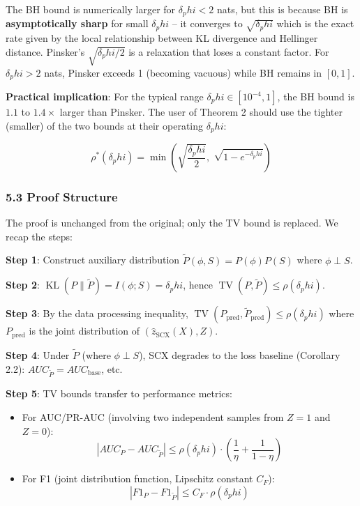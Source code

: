 \documentclass[
  12pt,
]{ctexart}
\providecommand{\tightlist}{%
  \setlength{\itemsep}{0pt}\setlength{\parskip}{0pt}}
\begin{document}
The BH bound is numerically larger for \(\delta_phi < 2\) nats, but this
is because BH is \textbf{asymptotically sharp} for small \(\delta_phi\)
-- it converges to \(\sqrt{\delta_phi}\) which is the exact rate given
by the local relationship between KL divergence and Hellinger distance.
Pinsker's \(\sqrt{\delta_phi/2}\) is a relaxation that loses a constant
factor. For \(\delta_phi > 2\) nats, Pinsker exceeds 1 (becoming
vacuous) while BH remains in \([0,1]\).

\textbf{Practical implication}: For the typical range
\(\delta_phi \in [10^{-4}, 1]\), the BH bound is \(1.1\) to
\(1.4\times\) larger than Pinsker. The user of Theorem 2 should use the
tighter (smaller) of the two bounds at their operating \(\delta_phi\):

\[\rho^*(\delta_phi) = \min\left(\sqrt{\frac{\delta_phi}{2}},\; \sqrt{1 - e^{-\delta_phi}}\right)\]

\subsubsection{5.3 Proof Structure}\label{proof-structure}

The proof is unchanged from the original; only the TV bound is replaced.
We recap the steps:

\textbf{Step 1}: Construct auxiliary distribution
\(\tilde{P}(\phi, S) = P(\phi)P(S)\) where \(\phi \perp S\).

\textbf{Step 2}:
\(\operatorname{KL}(P \| \tilde{P}) = I(\phi; S) = \delta_phi\), hence
\(\operatorname{TV}(P, \tilde{P}) \leq \rho(\delta_phi)\).

\textbf{Step 3}: By the data processing inequality,
\(\operatorname{TV}(P_{\text{pred}}, \tilde{P}_{\text{pred}}) \leq \rho(\delta_phi)\)
where \(P_{\text{pred}}\) is the joint distribution of
\((\hat{z}_{\text{SCX}}(X), Z)\).

\textbf{Step 4}: Under \(\tilde{P}\) (where \(\phi \perp S\)), SCX
degrades to the loss baseline (Corollary 2.2):
\(AUC_{\tilde{P}} = AUC_{\text{base}}\), etc.

\textbf{Step 5}: TV bounds transfer to performance metrics:

\begin{itemize}
\tightlist
\item
  For AUC/PR-AUC (involving two independent samples from \(Z=1\) and
  \(Z=0\)):
  \[|AUC_P - AUC_{\tilde{P}}| \leq \rho(\delta_phi) \cdot \left(\frac{1}{\eta} + \frac{1}{1-\eta}\right)\]
\item
  For F1 (joint distribution function, Lipschitz constant \(C_F\)):
  \[|F1_P - F1_{\tilde{P}}| \leq C_F \cdot \rho(\delta_phi)\]
\end{itemize}
\end{document}
